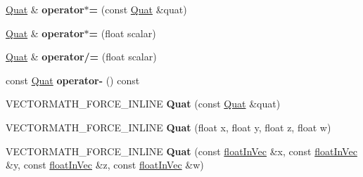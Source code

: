 \begin{DoxyCompactItemize}
\item 
\mbox{\label{classVectormath_1_1Aos_1_1Quat_aa2236fb5e7006f0bf72a23b4a4606c13}} 
\hyperlink{classVectormath_1_1Aos_1_1Quat}{Quat} \& {\bfseries operator$\ast$=} (const \hyperlink{classVectormath_1_1Aos_1_1Quat}{Quat} \&quat)
\item 
\mbox{\label{classVectormath_1_1Aos_1_1Quat_ab5da49301367b36085a58c53734433c9}} 
\hyperlink{classVectormath_1_1Aos_1_1Quat}{Quat} \& {\bfseries operator$\ast$=} (float scalar)
\item 
\mbox{\label{classVectormath_1_1Aos_1_1Quat_a5af07567b079fe049ca809335c5c3848}} 
\hyperlink{classVectormath_1_1Aos_1_1Quat}{Quat} \& {\bfseries operator/=} (float scalar)
\item 
\mbox{\label{classVectormath_1_1Aos_1_1Quat_ababc074bd904ad56ffc13dd6b6ce48e3}} 
const \hyperlink{classVectormath_1_1Aos_1_1Quat}{Quat} {\bfseries operator-\/} () const
\item 
\mbox{\label{classVectormath_1_1Aos_1_1Quat_a102854a15448f2159ad8ed45e2573275}} 
V\+E\+C\+T\+O\+R\+M\+A\+T\+H\+\_\+\+F\+O\+R\+C\+E\+\_\+\+I\+N\+L\+I\+NE {\bfseries Quat} (const \hyperlink{classVectormath_1_1Aos_1_1Quat}{Quat} \&quat)
\item 
\mbox{\label{classVectormath_1_1Aos_1_1Quat_affbeca410d11cee6e77ea27c610ab386}} 
V\+E\+C\+T\+O\+R\+M\+A\+T\+H\+\_\+\+F\+O\+R\+C\+E\+\_\+\+I\+N\+L\+I\+NE {\bfseries Quat} (float x, float y, float z, float w)
\item 
\mbox{\label{classVectormath_1_1Aos_1_1Quat_a72f6aa056be2f52ae1ff2175b3856060}} 
V\+E\+C\+T\+O\+R\+M\+A\+T\+H\+\_\+\+F\+O\+R\+C\+E\+\_\+\+I\+N\+L\+I\+NE {\bfseries Quat} (const \hyperlink{classVectormath_1_1floatInVec}{float\+In\+Vec} \&x, const \hyperlink{classVectormath_1_1floatInVec}{float\+In\+Vec} \&y, const \hyperlink{classVectormath_1_1floatInVec}{float\+In\+Vec} \&z, const \hyperlink{classVectormath_1_1floatInVec}{float\+In\+Vec} \&w)
\item 
\mbox{\label{classVectormath_1_1Aos_1_1Quat_a8af91b1419e8548fc2d987fc662dce64}} 

\end{DoxyCompactItemize}
